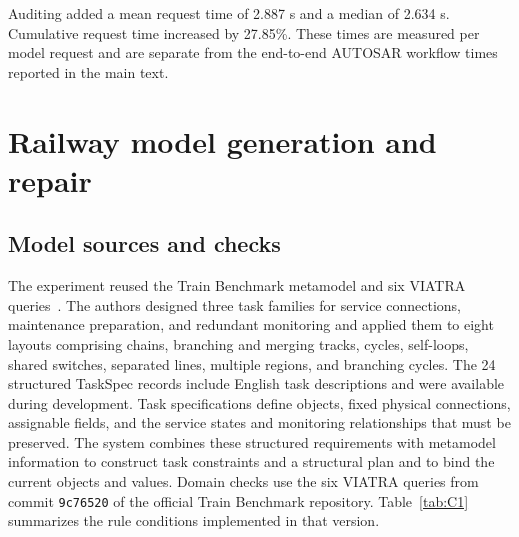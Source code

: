 \documentclass[pdflatex,iicol,sn-mathphys-num]{sn-jnl}
\newcommand{\paperref}[1]{~\citep{#1}}
\begin{document}
Auditing added a mean request time of 2.887 s and a median of 2.634 s. Cumulative request time increased by 27.85\%. These times are measured per model request and are separate from the end-to-end AUTOSAR workflow times reported in the main text.


\FloatBarrier

\setcounter{table}{0}

\section{Railway model generation and repair}\label{app:C}

\subsection{Model sources and checks}\label{app:C-1}

The experiment reused the Train Benchmark metamodel and six VIATRA queries\paperref{Szarnyas2018}. The authors designed three task families for service connections, maintenance preparation, and redundant monitoring and applied them to eight layouts comprising chains, branching and merging tracks, cycles, self-loops, shared switches, separated lines, multiple regions, and branching cycles. The 24 structured TaskSpec records include English task descriptions and were available during development. Task specifications define objects, fixed physical connections, assignable fields, and the service states and monitoring relationships that must be preserved. The system combines these structured requirements with metamodel information to construct task constraints and a structural plan and to bind the current objects and values. Domain checks use the six VIATRA queries from commit \texttt{9c76520} of the official Train Benchmark repository. Table~\ref{tab:C1} summarizes the rule conditions implemented in that version.
\end{document}

